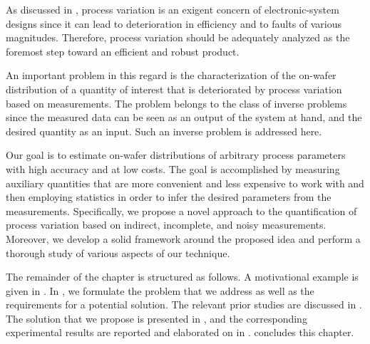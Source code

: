 As discussed in , process variation is an exigent
concern of electronic-system designs since it can lead to deterioration in
efficiency and to faults of various magnitudes. Therefore, process variation
should be adequately analyzed as the foremost step toward an efficient and
robust product.

An important problem in this regard is the characterization of the on-wafer
distribution of a quantity of interest that is deteriorated by process variation
based on measurements. The problem belongs to the class of inverse problems
since the measured data can be seen as an output of the system at hand, and the
desired quantity as an input. Such an inverse problem is addressed here.

Our goal is to estimate on-wafer distributions of arbitrary process parameters
with high accuracy and at low costs. The goal is accomplished by measuring
auxiliary quantities that are more convenient and less expensive to work with
and then employing statistics in order to infer the desired parameters from the
measurements. Specifically, we propose a novel approach to the quantification of
process variation based on indirect, incomplete, and noisy measurements.
Moreover, we develop a solid framework around the proposed idea and perform a
thorough study of various aspects of our technique.

The remainder of the chapter is structured as follows. A motivational example is
given in . In , we formulate
the problem that we address as well as the requirements for a potential
solution. The relevant prior studies are discussed in .
The solution that we propose is presented in , and the
corresponding experimental results are reported and elaborated on in
.  concludes this chapter.
